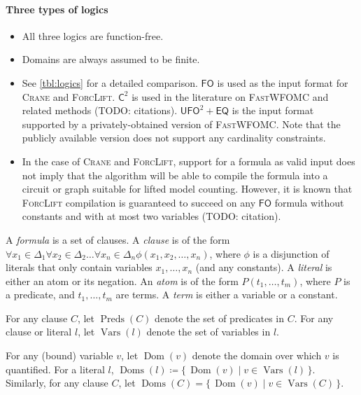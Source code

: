 \documentclass{article}
\DeclareMathOperator{\Dom}{Dom}
\DeclareMathOperator{\Doms}{Doms}
\DeclareMathOperator{\Preds}{Preds}
\DeclareMathOperator{\Vars}{Vars}
\newcommand{\Ctwo}{$\mathsf{C}^{2}$}
\newcommand{\FO}{$\mathsf{FO}$}
\newcommand{\UFO}{$\mathsf{UFO}^{2} + \mathsf{EQ}$}
\begin{document}
\paragraph{Three types of logics}
\begin{itemize}
  \item All three logics are function-free.
  \item Domains are always assumed to be finite.
  \item See \cref{tbl:logics} for a detailed comparison. \FO{} is used as the
        input format for \textsc{Crane} and \textsc{ForcLift}. \Ctwo{} is used
        in the literature on \textsc{FastWFOMC} and related methods (TODO:
        citations). \UFO{} is the input format supported by a privately-obtained
        version of \textsc{FastWFOMC}. Note that the publicly available version
        does not support any cardinality constraints.
  \item In the case of \textsc{Crane} and \textsc{ForcLift}, support for a
        formula as valid input does not imply that the algorithm will be able to
        compile the formula into a circuit or graph suitable for lifted model
        counting. However, it is known that \textsc{ForcLift} compilation is
        guaranteed to succeed on any \FO{} formula without constants and with at
        most two variables (TODO: citation).
\end{itemize}

A \emph{formula} is a set of clauses. A \emph{clause} is of the form
$\forall x_{1} \in \Delta_{1}\forall x_{2} \in \Delta_{2}\dots\forall x_{n} \in \Delta_{n} \phi(x_{1}, x_{2}, \dots, x_{n})$,
where $\phi$ is a disjunction of literals that only contain variables
$x_{1}, \dots, x_{n}$ (and any constants). A \emph{literal} is either an atom or
its negation. An \emph{atom} is of the form $P(t_{1}, \dots, t_{m})$, where $P$
is a predicate, and $t_{1}, \dots, t_{m}$ are terms. A \emph{term} is either a
variable or a constant.


For any clause $C$, let $\Preds(C)$ denote the set of predicates in $C$. For any
clause or literal $l$, let $\Vars(l)$ denote the set of variables in $l$.

For any (bound) variable $v$, let $\Dom(v)$ denote the domain over which $v$ is
quantified. For a literal $l$,
$\Doms(l) \coloneqq \{\, \Dom(v) \mid v \in \Vars(l) \,\}$. Similarly, for any
clause $C$, let $\Doms(C) = \{\, \Dom(v) \mid v \in \Vars(C) \,\}$.
\end{document}
